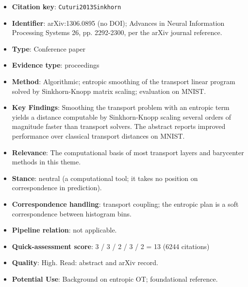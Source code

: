 \documentclass[journal,onecolumn]{IEEEtran}
\begin{document}
\begin{itemize}

\item{} \textbf{Citation key}: \texttt{Cuturi2013Sinkhorn}

\item{} \textbf{Identifier}: arXiv:1306.0895 (no DOI); Advances in Neural Information Processing Systems 26, pp. 2292-2300, per the arXiv journal reference.

\item{} \textbf{Type}: Conference paper

\item{} \textbf{Evidence type}: proceedings

\item{} \textbf{Method}: Algorithmic; entropic smoothing of the transport linear program solved by Sinkhorn-Knopp matrix scaling; evaluation on MNIST.

\item{} \textbf{Key Findings}: Smoothing the transport problem with an entropic term yields a distance computable by Sinkhorn-Knopp scaling several orders of magnitude faster than transport solvers. The abstract reports improved performance over classical transport distances on MNIST.

\item{} \textbf{Relevance}: The computational basis of most transport layers and barycenter methods in this theme.

\item{} \textbf{Stance}: neutral (a computational tool; it takes no position on correspondence in prediction).

\item{} \textbf{Correspondence handling}: transport coupling; the entropic plan is a soft correspondence between histogram bins.

\item{} \textbf{Pipeline relation}: not applicable.

\item{} \textbf{Quick-assessment score}: 3 / 3 / 2 / 3 / 2 = 13 (6244 citations)

\item{} \textbf{Quality}: High. Read: abstract and arXiv record.

\item{} \textbf{Potential Use}: Background on entropic OT; foundational reference.

\end{itemize}
\end{document}
